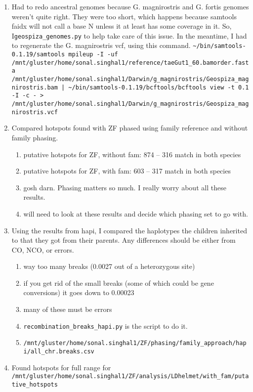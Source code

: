 \documentclass[idxtotoc,hyperref,openany,oneside]{labbook} %
\begin{document}
\begin{enumerate}
\item Had to redo ancestral genomes because G. magnirostris and G. fortis genomes weren't quite right. They were too short, which happens because samtools faidx will not call a base N unless it at least has some coverage in it. So, I\verb+geospiza_genomes.py+ to help take care of this issue. In the meantime, I had to regenerate the G. magnirostris vcf, using this command. \verb+~/bin/samtools-0.1.19/samtools mpileup -I -uf /mnt/gluster/home/sonal.singhal1/reference/taeGut1_60.bamorder.fasta /mnt/gluster/home/sonal.singhal1/Darwin/g_magnirostris/Geospiza_magnirostris.bam | ~/bin/samtools-0.1.19/bcftools/bcftools view -t 0.1 -I -c - > /mnt/gluster/home/sonal.singhal1/Darwin/g_magnirostris/Geospiza_magnirostris.vcf+
\item Compared hotspots found with ZF phased using family reference and without family phasing.
\begin{enumerate}
	\item putative hotspots for ZF, without fam: 874 -- 316 match in both species
	\item putative hotspots for ZF, with fam: 603 -- 317 match in both species
	\item gosh darn. Phasing matters so much. I really worry about all these results.
	\item will need to look at these results and decide which phasing set to go with.
\end{enumerate}
\item Using the results from hapi, I compared the haplotypes the children inherited to that they got from their parents. Any differences should be either from CO, NCO, or errors.
\begin{enumerate}
	\item way too many breaks (0.0027 out of a heterozygous site)
	\item if you get rid of the small breaks (some of which could be gene conversions) it goes down to 0.00023
	\item many of these must be errors
	\item \verb+recombination_breaks_hapi.py+ is the script to do it.
	\item \verb+/mnt/gluster/home/sonal.singhal1/ZF/phasing/family_approach/hapi/all_chr.breaks.csv+
\end{enumerate}
\item Found hotspots for full range for \verb+/mnt/gluster/home/sonal.singhal1/ZF/analysis/LDhelmet/with_fam/putative_hotspots+

\end{enumerate}
\end{document}
